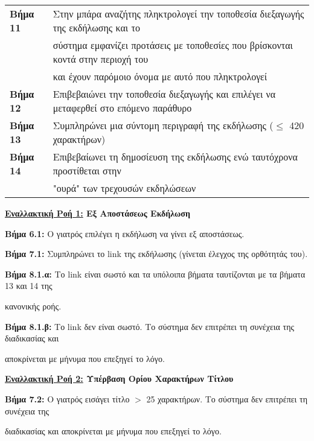 \documentclass{article}
\newcommand\T{\rule{0pt}{2.6ex}}       %
\newcommand\B{\rule[-1.2ex]{0pt}{0pt}}
\begin{document}
\begin{center}
\begin{tabular}{|l|l|}
      \hline
       \textbf{Βήμα 11} & Στην μπάρα αναζήτης πληκτρολογεί την τοποθεσία διεξαγωγής της εκδήλωσης και το \T \\& σύστημα εμφανίζει προτάσεις με τοποθεσίες που βρίσκονται κοντά στην περιοχή του \\& και έχουν παρόμοιο όνομα με αυτό που πληκτρολογεί \B \\
      \hline
       \textbf{Βήμα 12} & Επιβεβαιώνει την τοποθεσία διεξαγωγής και επιλέγει να μεταφερθεί στο επόμενο παράθυρο\T\B \\
      \hline
       \textbf{Βήμα 13} & Συμπληρώνει μια σύντομη περιγραφή της εκδήλωσης ($\le$ 420 χαρακτήρων) \T\B \\
      \hline
       \textbf{Βήμα 14} & Επιβεβαίωνει τη δημοσίευση της εκδήλωσης ενώ ταυτόχρονα προστίθεται στην \T \\& "ουρά" των τρεχουσών εκδηλώσεων \B \\
      \hline
     \end{tabular}
 \end{center}
 
 \newpage
 
  \textbf{\underline{Εναλλακτική Ροή 1:} Εξ Αποστάσεως Εκδήλωση} \vspace{0.2cm}
\par \textbf{Βήμα 6.1:} Ο γιατρός επιλέγει η εκδήλωση να γίνει εξ αποστάσεως.\vspace{0.1cm}

\par\textbf{Βήμα 7.1:} Συμπληρώνει το link της εκδήλωσης (γίνεται έλεγχος της ορθότητάς του). \vspace{0.1cm}
\par \textbf{Βήμα 8.1.α:} Το link είναι σωστό και τα υπόλοιπα βήματα ταυτίζονται με τα βήματα 13 και 14 της \par κανονικής ροής. \vspace{0.2cm}
\par \textbf{Βήμα 8.1.β:} Το link δεν είναι σωστό. Το σύστημα δεν επιτρέπει τη συνέχεια της διαδικασίας και \par αποκρίνεται με μήνυμα που επεξηγεί το λόγο. \vspace{0.2cm}

\textbf{\underline{Εναλλακτική Ροή 2:} Υπέρβαση Ορίου Χαρακτήρων Τίτλου} \vspace{0.2cm}
\par \textbf{Βήμα 7.2:} Ο γιατρός εισάγει τίτλο $>$ 25 χαρακτήρων. Το σύστημα δεν επιτρέπει τη συνέχεια της \par διαδικασίας και αποκρίνεται με μήνυμα που επεξηγεί το λόγο. \vspace{0.2cm}
\end{document}
